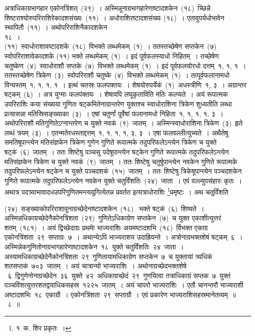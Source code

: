 \documentclass[11pt, openany]{book}
\begin{document}
\indent
अत्राधिकाग्रभागहार एकोनत्रिंशत्~(२९)~। अस्मिन्नूनाग्रभागहारेणाष्टादशकेन~(१८)~च्छिन्ने शिष्टराश्योरुपरिराशिरेकादशसंख्यः~(११)~। अधोराशिरष्टादशसंख्यः (१८)~। एतावुपर्यधोभावेन स्थापितौ~(११)~। अथोपरिराशिनैकादशकेन\\
\indent
\hspace{5.9cm}
१८~।\\
\noindent
(११)~स्वाधोराशावष्टादशके~(१८)~विभक्ते लब्धमेकम्~(१)~। ततस्तच्छेषेण सप्तकेन~(७)~ स्वोपरिराशावेकादशके (११) भक्ते लब्धमेकम्~(१)~। इदं पूर्वफलस्याधो निहितम्~। तच्छेषेण चतुष्केण~(४)~स्वाधोराशौ सप्तके~(७)~विभक्ते लब्धमेकम्~(१)~। इदं पूर्वफलयोरधो दत्तम्~१, १, १~। ततस्तच्छेषेण त्रिकेण~(३)~स्वोपरिराशौ चतुष्के~(४)~विभक्ते लब्धमेकम्~(१)~। तत्पूर्वफलानामधो विन्यस्तम्~१, १, १, १~। इत्थं चतस्रः फलपक्तयः~। शेषयोरुपर्येकं~(१)~अधस्त्रीणि~१, ३~। अग्रान्तर षट्कम्~(६)~। अत्र युग्माः फलपंक्तयः~। शेषावपि लघूकृताविति मतिः कल्प्यते~। अयं रूपात्मक उपरिराशिः कया संख्यया गुणितः षट्कमितेनाग्रान्तरेण युक्तश्च स्वाधोराशिना त्रिकेण शुध्यतीति लब्धा प्रत्यासन्ना मतिस्रिसङ्ख्याका~(३)~। एषां चतुर्णां पूर्वेषां फलानामधो निहिता~१, १, १, १, ३~। अथोपरिराशौ मतिगुणितेऽग्नान्तरेण च युक्ते नवकं~(९)~जातम्~। अस्मिन्स्वाधोराशिना त्रिकेण~(३)~हृते लब्धं त्रयम्~(३)~। एतन्मतेरधस्ताद्दत्तम्~१, १, १, १, ३, ३~। एषा फलवल्लीत्युच्यते~। अथैतेषु समतिषूपान्त्येन मतिसंज्ञकेन त्रिकेण गुणेन गुणिते रूपात्मके तदुपरिफलेऽन्त्येन त्रिकेण च युक्ते षट्कं~(६)~जातम्~। ततः शिष्टेषु पञ्चसु पदेषूपान्त्येन षट्केन गुणिते रूपात्मके तदुपरिफलेऽन्त्येन मतिसंज्ञकेन त्रिकेण च युक्ते नवकं~(९)~जातम्~। ततः शिष्टेषु चतुर्षूपान्त्येन नवकेन गुणिते रूपात्मके तदुपरिफलेऽन्त्येन षट्केन च युक्ते पञ्चदशकं~(१५)~जातम्~। ततः शिष्टेषु त्रिकेषूपान्त्येन पञ्चदशकेन गुणिते रूपात्मके तदुपरिफलेऽन्त्येन नवकेन युक्ते चतुर्विंशतिः~(२४)~जाता~। एवं वल्ल्युपसंहारः कृतः~। अथात्र पदत्र्याभावादधउपरिगुणितमन्त्ययुगित्येतन्न प्रवर्तत इत्यत्राधोराशिः \renewcommand\thefootnote{१}\footnote{१~क.  शिर प्रकृतः~।}प्रमृष्टः~। अथ चतुर्विंशति\textendash


\newpage
\thispagestyle{fancy}
\fancyhf{}

\noindent
(२४)~सङ्ख्याकोपरिराशावूनाग्रच्छेदेनाष्टादशकेन~(१८)~ भक्ते षट्कं~(६)~शिष्यते~। अस्मिन्नधिकाग्रच्छेदेनैकोनत्रिंशता~(२९)~गुणितेऽधिकाग्रेण सप्तकेन~(७)~च युक्त एकाशीत्युत्तरं शतम्~(१८१)~। अयं द्विच्छेदाग्रः प्रथमाे भाज्यराशिः अयमष्टादशभि~(१८)~र्विभक्त एकाग्र एकोनत्रिंशता~२९~सप्ताग्रः~७~। अथान्येऽपि भाज्यराशय उदाह्रियन्ते~। अत्रोनाग्रभक्तशेषं षट्कम्~६~। अस्मिन्नेकगुणितोनाग्रभागहारेणाष्टादशकेन~१८~युक्ते चतुर्विंशतिः~२४~जाता~। अस्यामधिकाग्रच्छेदेनैकोनत्रिंशता~२९~गुणितायामधिकाग्रेण सप्तकेन~७~च युक्तायां त्र्यधिकं शतसप्तकं~७०३~जातम्~। अयं चात्रान्यो भाज्यराशिः~। अथोनाग्रच्छेदभक्तशेषे ~६~द्विगुणेनोनाग्रच्छेदेन~३६~युक्ते~४२~अधिकाग्रच्छेदं~२९~गुणयित्वा तत्राधिकाग्रं सप्तक~७~युक्तं पञ्चविंशत्युत्तरशतद्वयाधिकसहस्र~१२२५~जातम्~। अयं चापरो भाज्यराशिः~। एतौ चानन्तरौ भाज्यराशी अष्टादशभिः~१८~एकाग्रौ~। एकोनत्रिंशता~२९~सप्ताग्रौ~। एवं प्रकारेण भाज्यराशिसहस्रमानेतव्यम्~॥~८~॥\\
\end{document}
